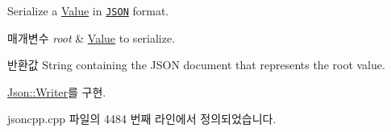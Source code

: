 Serialize a \hyperlink{class_json_1_1_value}{Value} in \href{http://www.json.org}{\tt J\+S\+ON} format. 


\begin{DoxyParams}{매개변수}
{\em root} & \hyperlink{class_json_1_1_value}{Value} to serialize. \\
\hline
\end{DoxyParams}
\begin{DoxyReturn}{반환값}
String containing the J\+S\+ON document that represents the root value. 
\end{DoxyReturn}


\hyperlink{class_json_1_1_writer_a61c55882b82c7651d0b9b683c6d3f371}{Json\+::\+Writer}를 구현.



jsoncpp.\+cpp 파일의 4484 번째 라인에서 정의되었습니다.


